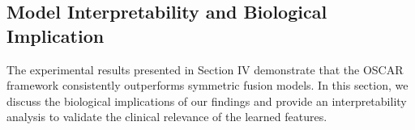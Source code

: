 \documentclass[lettersize,journal]{IEEEtran}
\begin{document}





\subsection{Model Interpretability and Biological Implication}

The experimental results presented in Section IV demonstrate that the OSCAR framework consistently outperforms symmetric fusion models. In this section, we discuss the biological implications of our findings and provide an interpretability analysis to validate the clinical relevance of the learned features.
\end{document}
